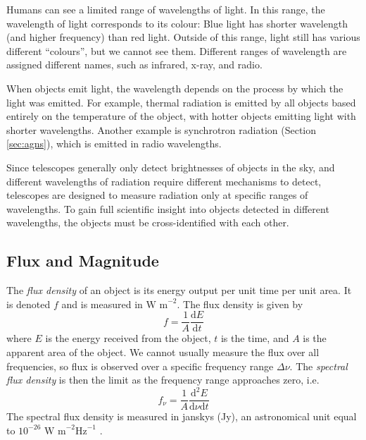             Humans can see a limited range of wavelengths of light. In this
            range, the wavelength of light corresponds to its colour: Blue light
            has shorter wavelength (and higher frequency) than red light.
            Outside of this range, light still has various different
            ``colours'', but we cannot see them. Different ranges of wavelength
            are assigned different names, such as infrared, x-ray, and radio.

            When objects emit light, the wavelength depends on the process by
            which the light was emitted. For example, thermal radiation is
            emitted by all objects based entirely on the temperature of the
            object, with hotter objects emitting light with shorter wavelengths.
            Another example is synchrotron radiation (Section \ref{sec:agns}),
            which is emitted in radio wavelengths.

            Since telescopes generally only detect brightnesses of objects in
            the sky, and different wavelengths of radiation require different
            mechanisms to detect, telescopes are designed to measure radiation
            only at specific ranges of wavelengths. To gain full scientific
            insight into objects detected in different wavelengths, the objects
            must be cross-identified with each other.

        \subsection{Flux and Magnitude}

            The \emph{flux density} of an object is its energy output per unit
            time per unit area. It is denoted $f$ and is measured in $\text{W
            m}^{-2}$. The flux density is given by
            \[
                f = \frac{1}{A}\frac{\text{d}E}{\text{d}t}
            \]
            where $E$ is the energy received from the object, $t$ is the time,
            and $A$ is the apparent area of the object. We cannot usually
            measure the flux over all frequencies, so flux is observed over a
            specific frequency range $\Delta \nu$. The \emph{spectral flux
            density} is then the limit as the frequency range approaches zero,
            i.e.
            \[
                f_\nu = \frac{1}{A}\frac{\text{d}^2E}{\text{d}\nu\text{d}t}
            \]
            The spectral flux density is measured in janskys (Jy), an
            astronomical unit equal to $10^{-26} \text{ W m}^{-2} \text{
            Hz}^{-1}$ \citep{francis08}.

